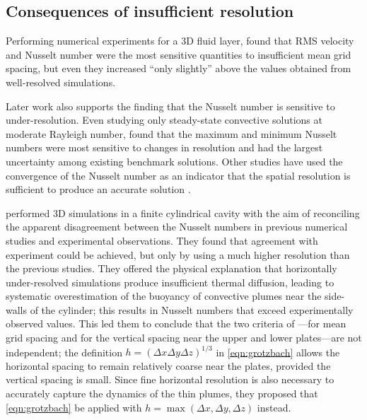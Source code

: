 \documentclass[../main.tex]{subfiles}
\begin{document}
\subsection{Consequences of insufficient resolution}

Performing numerical experiments for a 3D fluid layer,
\citeauthor{grotzbach1983} found that RMS velocity and Nusselt number were the
most sensitive quantities to insufficient mean grid spacing, but even they
increased ``only slightly'' above the values obtained from well-resolved
simulations.

Later work also supports the finding that the Nusselt number is sensitive to
under-resolution. Even studying only steady-state convective solutions at
moderate Rayleigh number, \textcite{le_quere1991} found that the maximum and
minimum Nusselt numbers were most sensitive to changes in resolution and had
the largest uncertainty among existing benchmark solutions.
Other studies have used the convergence of the Nusselt number as an indicator
that the spatial resolution is sufficient to produce an accurate solution
\parencite{ouertatani2008}.

\textcite{stevens2010} performed 3D simulations in a finite cylindrical cavity
with the aim of reconciling the apparent disagreement between the Nusselt
numbers in previous numerical studies and experimental observations. They found
that agreement with experiment could be achieved, but only by using a much
higher resolution than the previous studies. They offered the physical
explanation that horizontally under-resolved simulations produce insufficient
thermal diffusion, leading to systematic overestimation of the buoyancy of
convective plumes near the side-walls of the cylinder; this results in Nusselt
numbers that exceed experimentally observed values. This led them to conclude
that the two criteria of \textcite{grotzbach1983}---for mean grid spacing and
for the vertical spacing near the upper and lower plates---are not independent;
the definition $h = (\Delta x \Delta y \Delta z)^{1/3}$ in \cref{eqn:grotzbach}
allows the horizontal spacing to remain relatively coarse near the plates,
provided the vertical spacing is small. Since fine horizontal resolution is
also necessary to accurately capture the dynamics of the thin plumes, they
proposed that \cref{eqn:grotzbach} be applied with $h = \max(\Delta x, \Delta
y, \Delta z)$ instead.
\end{document}
